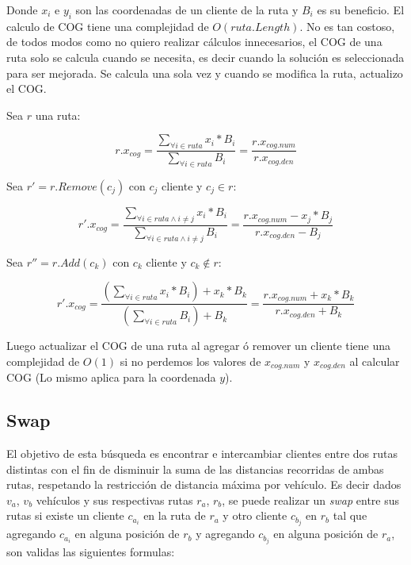 Donde $x_i$ e $y_i$ son las coordenadas de un cliente de la ruta y $B_i$ es su beneficio.
El calculo de COG tiene una complejidad de $O(ruta.Length)$. No es tan costoso, de todos modos como no quiero realizar cálculos innecesarios, el COG de una ruta solo se calcula cuando se necesita, es decir cuando la solución es seleccionada para ser mejorada. Se calcula una sola vez y cuando se modifica la ruta, actualizo el COG.

\bigskip

Sea $r$ una ruta:

\begin{equation}
r.x_{cog} =  \frac{\sum_{\forall i \in ruta} x_i * B_i}{\sum_{\forall i \in ruta} B_i}  = \frac{r.x_{cog.num}}{r.x_{cog.den}}
\end{equation}

\bigskip

Sea $r' = r.Remove(c_j)$ con $c_j$ cliente y $c_j \in r$:

\begin{equation}
r'.x_{cog} =  \frac{\sum_{\forall i \in ruta \wedge i \neq j} x_i * B_i}{\sum_{\forall i \in ruta \wedge i \neq j} B_i}  = \frac{r.x_{cog.num}-x_j*B_j}{r.x_{cog.den}-B_j}
\end{equation}

\bigskip

Sea $r'' = r.Add(c_k)$ con $c_k$ cliente y $c_k \notin r$:

\begin{equation}
r'.x_{cog} =  \frac{(\sum_{\forall i \in ruta} x_i * B_i) + x_k * B_k}{(\sum_{\forall i \in ruta} B_i) + B_k}  = \frac{r.x_{cog.num}+x_k*B_k}{r.x_{cog.den}+B_k}
\end{equation}

\bigskip

Luego actualizar el COG de una ruta al agregar ó remover un cliente tiene una complejidad de $O(1)$ si no perdemos los valores de $x_{cog.num}$ y $x_{cog.den}$ al calcular COG (Lo mismo aplica para la coordenada $y$).

\bigskip


\subsection{Swap}

El objetivo de esta búsqueda es encontrar e intercambiar clientes entre dos rutas distintas con el fin de disminuir la suma de las distancias recorridas de ambas rutas, respetando la restricción de distancia máxima por vehículo. Es decir dados $v_a$, $v_b$ vehículos y sus respectivas rutas $r_a$, $r_b$, se puede realizar un \textit{swap} entre sus rutas si existe un cliente $c_{a_i}$ en la ruta de $r_a$ y otro cliente $c_{b_j}$ en $r_b$ tal que agregando $c_{a_i}$ en alguna posición de $r_b$ y agregando $c_{b_j}$ en alguna posición de $r_a$, son validas las siguientes formulas:

